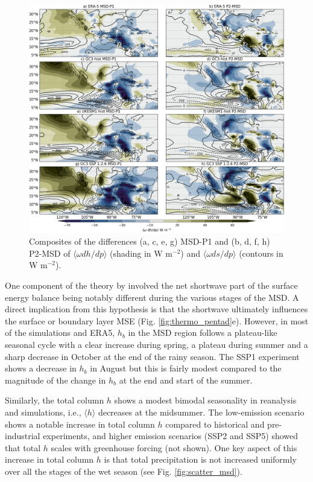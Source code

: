 \begin{figure}[t!]
\includegraphics[width=\linewidth]{figures/thermocompositewdhdpanom.png}
\caption[Composites of the anomalous vertical advection of the MSE budget]{Composites of the differences (a, c, e, g) MSD-P1 and (b, d, f, h) P2-MSD of $\langle \omega dh/dp \rangle$ (shading in W m$^{-2}$) and $\langle \omega ds/dp \rangle$ (contours in W m$^{-2}$).  }
\label{fig:wdhdpanom}
\end{figure} 
 

One component of the theory by \cite{karnauskas2013} involved the net shortwave part of the surface energy balance being notably different during the various stages of the MSD. A direct implication from this hypothesis is that the shortwave ultimately influences the surface or boundary layer MSE (Fig. \ref{fig:thermo_pentad}e). However, in most of the simulations and ERA5, $h_b$ in the MSD region follows a plateau-like seasonal cycle with a clear increase during spring, a plateau during summer and a sharp decrease in October at the end of the rainy season. The SSP1 experiment shows a  decrease in $h_b$ in August but this is fairly modest compared to the magnitude of the change in $h_b$ at the end and start of the summer. 

Similarly, the total column $h$ shows a modest bimodal seasonality in reanalysis and simulations, i.e., $\langle h \rangle$ decreases at the midsummer. 
The low-emission scenario shows a notable increase in total column $h$ compared to historical and pre-industrial experiments, and higher emission scenarios (SSP2 and SSP5) showed that total $h$ scales with greenhouse forcing (not shown). One key aspect of this increase in total column $h$ is that total precipitation is not increased uniformly over all the stages of the wet season (see Fig. \ref{fig:scatter_msd}). 

